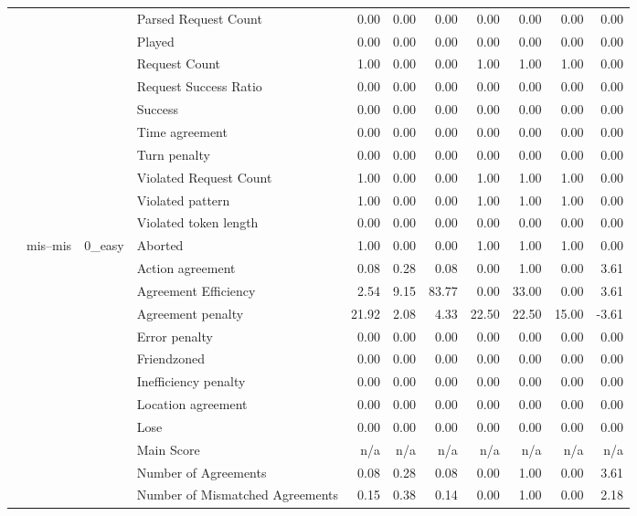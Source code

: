 \begin{tabular}{llllrrrrrrr}
 &  &  & Parsed Request Count & 0.00 & 0.00 & 0.00 & 0.00 & 0.00 & 0.00 & 0.00 \\
 &  &  & Played & 0.00 & 0.00 & 0.00 & 0.00 & 0.00 & 0.00 & 0.00 \\
 &  &  & Request Count & 1.00 & 0.00 & 0.00 & 1.00 & 1.00 & 1.00 & 0.00 \\
 &  &  & Request Success Ratio & 0.00 & 0.00 & 0.00 & 0.00 & 0.00 & 0.00 & 0.00 \\
 &  &  & Success & 0.00 & 0.00 & 0.00 & 0.00 & 0.00 & 0.00 & 0.00 \\
 &  &  & Time agreement & 0.00 & 0.00 & 0.00 & 0.00 & 0.00 & 0.00 & 0.00 \\
 &  &  & Turn penalty & 0.00 & 0.00 & 0.00 & 0.00 & 0.00 & 0.00 & 0.00 \\
 &  &  & Violated Request Count & 1.00 & 0.00 & 0.00 & 1.00 & 1.00 & 1.00 & 0.00 \\
 &  &  & Violated pattern & 1.00 & 0.00 & 0.00 & 1.00 & 1.00 & 1.00 & 0.00 \\
 &  &  & Violated token length & 0.00 & 0.00 & 0.00 & 0.00 & 0.00 & 0.00 & 0.00 \\
\cline{2-11} \cline{3-11}
 & \multirow[t]{378}{*}{mis--mis} & \multirow[t]{27}{*}{0_easy} & Aborted & 1.00 & 0.00 & 0.00 & 1.00 & 1.00 & 1.00 & 0.00 \\
 &  &  & Action agreement & 0.08 & 0.28 & 0.08 & 0.00 & 1.00 & 0.00 & 3.61 \\
 &  &  & Agreement Efficiency & 2.54 & 9.15 & 83.77 & 0.00 & 33.00 & 0.00 & 3.61 \\
 &  &  & Agreement penalty & 21.92 & 2.08 & 4.33 & 22.50 & 22.50 & 15.00 & -3.61 \\
 &  &  & Error penalty & 0.00 & 0.00 & 0.00 & 0.00 & 0.00 & 0.00 & 0.00 \\
 &  &  & Friendzoned & 0.00 & 0.00 & 0.00 & 0.00 & 0.00 & 0.00 & 0.00 \\
 &  &  & Inefficiency penalty & 0.00 & 0.00 & 0.00 & 0.00 & 0.00 & 0.00 & 0.00 \\
 &  &  & Location agreement & 0.00 & 0.00 & 0.00 & 0.00 & 0.00 & 0.00 & 0.00 \\
 &  &  & Lose & 0.00 & 0.00 & 0.00 & 0.00 & 0.00 & 0.00 & 0.00 \\
 &  &  & Main Score & n/a & n/a & n/a & n/a & n/a & n/a & n/a \\
 &  &  & Number of Agreements & 0.08 & 0.28 & 0.08 & 0.00 & 1.00 & 0.00 & 3.61 \\
 &  &  & Number of Mismatched Agreements & 0.15 & 0.38 & 0.14 & 0.00 & 1.00 & 0.00 & 2.18 \\

\end{tabular}
